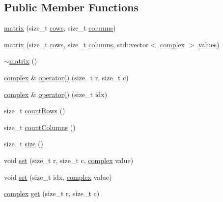 \subsection*{Public Member Functions}
\begin{DoxyCompactItemize}
\item 
\hyperlink{classqlib_1_1math_1_1matrix_a6e66a3f67ecf06a42068d2dbf8885e66}{matrix} (size\+\_\+t \hyperlink{classqlib_1_1math_1_1matrix_af29b6ea4316eb972bbdc55da6e54dbb3}{rows}, size\+\_\+t \hyperlink{classqlib_1_1math_1_1matrix_ad3c2dd80c600d7bf37ae5bbdf5f056b8}{columns})
\item 
\hyperlink{classqlib_1_1math_1_1matrix_a8cbac1f2ae9917a4742cd0d147e3ba9b}{matrix} (size\+\_\+t \hyperlink{classqlib_1_1math_1_1matrix_af29b6ea4316eb972bbdc55da6e54dbb3}{rows}, size\+\_\+t \hyperlink{classqlib_1_1math_1_1matrix_ad3c2dd80c600d7bf37ae5bbdf5f056b8}{columns}, std\+::vector$<$ \hyperlink{classqlib_1_1math_1_1complex}{complex} $>$ \hyperlink{classqlib_1_1math_1_1matrix_ad764d65375ba1e50381f640bdc181c0b}{values})
\item 
\hyperlink{classqlib_1_1math_1_1matrix_afebdd1cf189728ace53a594d5ef8b750}{$\sim$matrix} ()
\item 
\hyperlink{classqlib_1_1math_1_1complex}{complex} \& \hyperlink{classqlib_1_1math_1_1matrix_a50cbbef6e5b7888aecffbf66def70154}{operator()} (size\+\_\+t r, size\+\_\+t c)
\item 
\hyperlink{classqlib_1_1math_1_1complex}{complex} \& \hyperlink{classqlib_1_1math_1_1matrix_af93c414d328b985c83c032f41f485a9a}{operator()} (size\+\_\+t idx)
\item 
size\+\_\+t \hyperlink{classqlib_1_1math_1_1matrix_add844c31055d495274b037e7bcd8f0b7}{count\+Rows} ()
\item 
size\+\_\+t \hyperlink{classqlib_1_1math_1_1matrix_a69ed708edf603637731e4f6fe46b0754}{count\+Columns} ()
\item 
size\+\_\+t \hyperlink{classqlib_1_1math_1_1matrix_a2f0ada8003cf2306534700502f598428}{size} ()
\item 
void \hyperlink{classqlib_1_1math_1_1matrix_a2d09bd42691acdbf315d5cbd7a698698}{set} (size\+\_\+t r, size\+\_\+t c, \hyperlink{classqlib_1_1math_1_1complex}{complex} value)
\item 
void \hyperlink{classqlib_1_1math_1_1matrix_ae97863a30bb445897ff63c77582a366a}{set} (size\+\_\+t idx, \hyperlink{classqlib_1_1math_1_1complex}{complex} value)
\item 
\hyperlink{classqlib_1_1math_1_1complex}{complex} \hyperlink{classqlib_1_1math_1_1matrix_a91fcadaccfcd68adb71de0da6f5d267f}{get} (size\+\_\+t r, size\+\_\+t c)

\end{DoxyCompactItemize}
